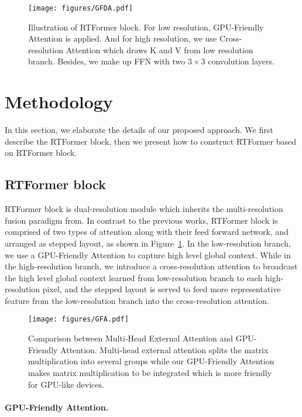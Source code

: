 \documentclass{article}
\begin{document}
\begin{figure}
    \centering
    \texttt{[image: figures/GFDA.pdf]}
    \caption{Illustration of RTFormer block. For low resolution, GPU-Friendly Attention is applied. And for high resolution, we use Cross-resolution Attention which draws K and V from low resolution branch. Besides, we make up FFN with two $3\times 3$ convolution layers.}
    \label{fig:GFDA}
\end{figure}


\section{Methodology}
In this section, we elaborate the details of our proposed approach. We first describe the RTFormer block, then we present how to construct RTFormer based on RTFormer block.

\subsection{RTFormer block}


RTFormer block is dual-resolution module which inherits the multi-resolution fusion paradigm from\cite{wang2020deep, hong2021deep, yuan2021hrformer}. In contrast to the previous works, RTFormer block is comprised of two types of attention along with their feed forward network, and arranged as stepped layout, as shown in Figure~\ref{fig:GFDA}. In the low-resolution branch, we use a GPU-Friendly Attention to capture high level global context. While in the high-resolution branch, we introduce a cross-resolution attention to broadcast the high level global context learned from low-resolution branch to each high-resolution pixel, and the stepped layout is served to feed more representative feature from the low-resolution branch into the cross-resolution attention.

\begin{wrapfigure}[25]{r}{7cm}
	\centering
	\texttt{[image: figures/GFA.pdf]}
	\caption{Comparison between Multi-Head External Attention and GPU-Friendly Attention. Multi-head external attention splits the matrix multiplication into several groups while our GPU-Friendly Attention makes matrix multiplication to be integrated which is more friendly for GPU-like devices.}
	\label{fig:GFA}
\end{wrapfigure}


\vspace{-2mm}
\paragraph{GPU-Friendly Attention.}
\end{document}
